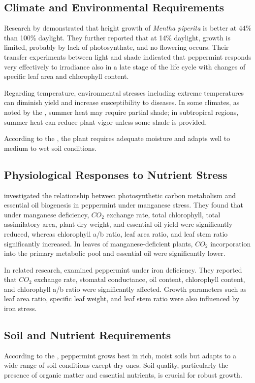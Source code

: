 \subsection*{Climate and Environmental Requirements}
Research by \textcite{virzo1980adaptability} demonstrated that height growth of \textit{Mentha piperita} is better at 44\% than 100\% daylight. They further reported that at 14\% daylight, growth is limited, probably by lack of photosynthate, and no flowering occurs. Their transfer experiments between light and shade indicated that peppermint responds very effectively to irradiance also in a late stage of the life cycle with changes of specific leaf area and chlorophyll content.

Regarding temperature, environmental stresses including extreme temperatures can diminish yield and increase susceptibility to diseases. In some climates, as noted by the \textcite{umd2026growing}, summer heat may require partial shade; in subtropical regions, summer heat can reduce plant vigor unless some shade is provided.

According to the \textcite{mobot2026piperita}, the plant requires adequate moisture and adapts well to medium to wet soil conditions.

\subsection*{Physiological Responses to Nutrient Stress}
\textcite{srivastava1994relationship} investigated the relationship between photosynthetic carbon metabolism and essential oil biogenesis in peppermint under manganese stress. They found that under manganese deficiency, $CO_{2}$ exchange rate, total chlorophyll, total assimilatory area, plant dry weight, and essential oil yield were significantly reduced, whereas chlorophyll a/b ratio, leaf area ratio, and leaf stem ratio significantly increased. In leaves of manganese-deficient plants, $CO_{2}$ incorporation into the primary metabolic pool and essential oil were significantly lower.

In related research, \textcite{srivastava1993relation} examined peppermint under iron deficiency. They reported that $CO_{2}$ exchange rate, stomatal conductance, oil content, chlorophyll content, and chlorophyll a/b ratio were significantly affected. Growth parameters such as leaf area ratio, specific leaf weight, and leaf stem ratio were also influenced by iron stress.

\subsection*{Soil and Nutrient Requirements}
According to the \textcite{umd2026growing}, peppermint grows best in rich, moist soils but adapts to a wide range of soil conditions except dry ones. Soil quality, particularly the presence of organic matter and essential nutrients, is crucial for robust growth.

